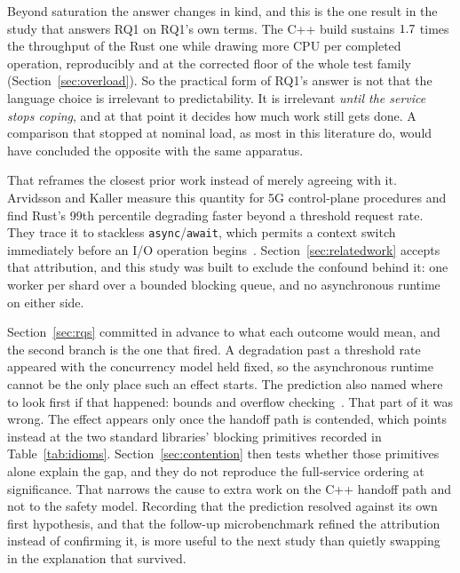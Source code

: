\documentclass[english,oneside,a4paper,censored,csm,software-track-2020]{HYthesisML}
\begin{document}
Beyond saturation the answer changes in kind, and this is the one result in the study that answers
RQ1 on RQ1's own terms. The C++ build sustains $1.7$ times the throughput of the
Rust one while drawing more CPU per completed operation, reproducibly and at the corrected floor
of the whole test family (Section~\ref{sec:overload}). So the practical form of RQ1's answer is
not that the language choice is irrelevant to predictability. It is irrelevant \emph{until the
service stops coping}, and at that point it decides how
much work still gets done. A comparison that stopped at nominal load, as most in this literature
do, would have concluded the opposite with the same apparatus.

That reframes the closest prior work instead of merely agreeing with it. Arvidsson and Kaller
measure this quantity for 5G control-plane procedures and find Rust's 99th percentile degrading
faster beyond a threshold request rate. They trace it to stackless
\texttt{async}/\texttt{await}, which permits a context switch immediately before an I/O operation
begins~\cite{arvidsson2025async}. Section~\ref{sec:relatedwork} accepts that attribution, and
this study was built to exclude the confound behind it: one worker per shard over a bounded
blocking queue, and no asynchronous runtime on either side.

Section~\ref{sec:rqs}
committed in advance to what each outcome would mean, and the second branch is the one that
fired. A degradation past a threshold rate appeared with the concurrency model held fixed, so the
asynchronous runtime cannot be the only place such an effect starts. The prediction also
named where to look first if that happened: bounds and overflow
checking~\cite{zhang2022runtime,harris2023morello}. That part of it was wrong. The effect
appears only once the handoff path is contended, which points instead at the two standard
libraries' blocking primitives recorded in Table~\ref{tab:idioms}. Section~\ref{sec:contention}
then tests whether those primitives alone explain the gap, and they do not reproduce the
full-service ordering at significance. That narrows the cause to extra work on the C++ handoff
path and not to the safety model. Recording that the prediction resolved against its own first
hypothesis, and that the follow-up microbenchmark refined the attribution instead of confirming it,
is more useful to the next study than quietly swapping in the explanation that survived.
\end{document}
